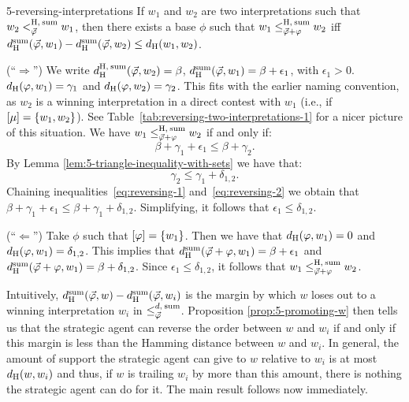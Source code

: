 \begin{lem}{}{5-reversing-interpretations}
	If $w_1$ and $w_2$ are two interpretations such that $w_2<^{{\operatorname{H}},\:{\operatorname{sum}}}_{\vec{\varphi}} w_1$,
	then there exists a base $\phi$ such that $w_1\le^{{\operatorname{H}},\:{\operatorname{sum}}}_{{\vec{\varphi}}+\varphi}w_2$
	iff $d_{\operatorname{H}}^{\operatorname{sum}}({\vec{\varphi}},w_1)-d_{\operatorname{H}}^{\operatorname{sum}}({\vec{\varphi}},w_2)\le d_{{\operatorname{H}}}(w_1,w_2)$.
\end{lem}
\begin{prf*}{}{}%
	(``$\Rightarrow$'') 
	We write $d_{\operatorname{H}}^{{\operatorname{H}},\:{\operatorname{sum}}}({\vec{\varphi}},w_2)=\beta$,
	$d_{\operatorname{H}}^{\operatorname{sum}}({\vec{\varphi}},w_1)=\beta+\epsilon_1$,
	with $\epsilon_1>0$.
	$d_{\operatorname{H}}(\varphi,w_1)=\gamma_1$
	and $d_{\operatorname{H}}(\varphi,w_2)=\gamma_2$.
	This fits with the earlier naming convention, 
	as $w_2$ is a winning interpretation in a direct contest with $w_1$
	(i.e., if $[\mu]=\{{w_1,w_2}\}$).
	See Table~\ref{tab:reversing-two-interpretations-1} for a nicer picture of this situation.
	We have $w_1\le^{{\operatorname{H}},\:{\operatorname{sum}}}_{{\vec{\varphi}}+\varphi}w_2$ if and only if:
	\begin{equation}\label{eq:reversing-1}
	\beta+\gamma_1+\epsilon_1\le \beta+\gamma_2.
	\end{equation}
	By Lemma \ref{lem:5-triangle-inequality-with-sets} we have that:
	\begin{equation}\label{eq:reversing-2}
	\gamma_2\leq\gamma_1+\delta_{1,2}.
	\end{equation}
	Chaining inequalities~\ref{eq:reversing-1} and~\ref{eq:reversing-2} we obtain that
	$\beta+\gamma_1+\epsilon_1\le\beta+\gamma_1+\delta_{1,2}$.
	Simplifying, it follows that $\epsilon_1\le\delta_{1,2}$.
		
	(``$\Leftarrow$'')
	Take $\phi$ such that $[\varphi]=\{{w_1}\}$.
	Then we have that $d_{\operatorname{H}}(\varphi,w_1)=0$ and $d_{\operatorname{H}}(\varphi,w_1)=\delta_{1,2}$.
	This implies that $d_{\operatorname{H}}^{\operatorname{sum}}({\vec{\varphi}}+\varphi,w_1)=\beta+\epsilon_1$
	and $d_{\operatorname{H}}^{\operatorname{sum}}({\vec{\varphi}}+\varphi,w_1)=\beta+\delta_{1,2}$.
	Since $\epsilon_1\leq\delta_{1,2}$, it follows that $w_1\le^{{\operatorname{H}},\:{\operatorname{sum}}}_{{\vec{\varphi}}+\varphi}w_2$.
\end{prf*}

Intuitively, $d_{\operatorname{H}}^{\operatorname{sum}}({\vec{\varphi}},w)-d_{\operatorname{H}}^{\operatorname{sum}}({\vec{\varphi}},w_i)$ is the margin by which $w$ loses out to a 
winning interpretation $w_i$ in $\le^{d,\:{\operatorname{sum}}}_{{\vec{\varphi}}}$. 
Proposition \ref{prop:5-promoting-w} then tells us that the strategic agent can reverse
the order between $w$ and $w_i$ if and only if this margin
is less than the Hamming distance between $w$ and $w_i$.
In general, the amount of support the strategic agent can give to $w$ relative to $w_i$ is at most 
$d_{\operatorname{H}}(w,w_i)$ and thus, if $w$ is trailing $w_i$ by more than this amount,
there is nothing the strategic agent can do for it.
The main result follows now immediately.

